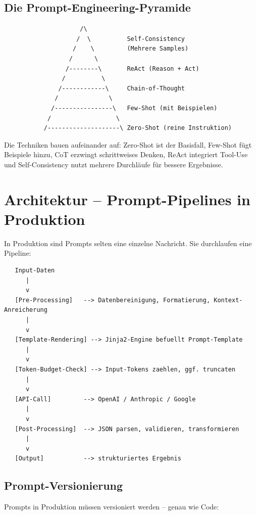 \subsection{Die Prompt-Engineering-Pyramide}

\begin{verbatim}
                     /\ 
                    /  \          Self-Consistency
                   /    \         (Mehrere Samples)
                  /      \
                 /--------\       ReAct (Reason + Act)
                /          \
               /------------\     Chain-of-Thought
              /              \
             /----------------\   Few-Shot (mit Beispielen)
            /                  \
           /--------------------\ Zero-Shot (reine Instruktion)
\end{verbatim}

Die Techniken bauen aufeinander auf: Zero-Shot ist der Basisfall, Few-Shot fügt Beispiele hinzu, CoT erzwingt schrittweises Denken, ReAct integriert Tool-Use und Self-Consistency nutzt mehrere Durchläufe für bessere Ergebnisse.

\section{Architektur -- Prompt-Pipelines in Produktion}

In Produktion sind Prompts selten eine einzelne Nachricht. Sie durchlaufen eine Pipeline:

\begin{verbatim}
   Input-Daten
      |
      v
   [Pre-Processing]   --> Datenbereinigung, Formatierung, Kontext-Anreicherung
      |
      v
   [Template-Rendering] --> Jinja2-Engine befuellt Prompt-Template
      |
      v
   [Token-Budget-Check] --> Input-Tokens zaehlen, ggf. truncaten
      |
      v
   [API-Call]         --> OpenAI / Anthropic / Google
      |
      v
   [Post-Processing]  --> JSON parsen, validieren, transformieren
      |
      v
   [Output]           --> strukturiertes Ergebnis
\end{verbatim}

\subsection{Prompt-Versionierung}

Prompts in Produktion müssen versioniert werden -- genau wie Code:

